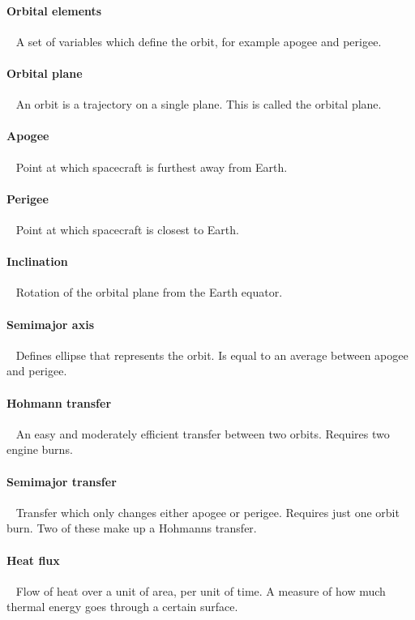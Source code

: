 \paragraph{Orbital elements}~
A set of variables which define the orbit, for example apogee and perigee.

\paragraph{Orbital plane}~
An orbit is a trajectory on a single plane. This is called the orbital plane.

\paragraph{Apogee}~
Point at which spacecraft is furthest away from Earth.

\paragraph{Perigee}~
Point at which spacecraft is closest to Earth.

\paragraph{Inclination}~
Rotation of the orbital plane from the Earth equator.

\paragraph{Semimajor axis}~
Defines ellipse that represents the orbit. Is equal to an average between apogee and perigee.

\paragraph{Hohmann transfer}~
An easy and moderately efficient transfer between two orbits. Requires two engine burns.

\paragraph{Semimajor transfer}~
Transfer which only changes either apogee or perigee. Requires just one orbit burn. Two of these make up a Hohmanns transfer.

\paragraph{Heat flux}~
Flow of heat over a unit of area, per unit of time. A measure of how much thermal energy goes through a certain surface.

